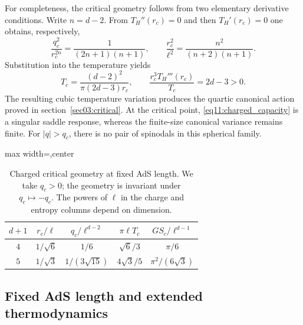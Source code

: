 \documentclass[11pt,letterpaper]{article}
\theoremstyle{plain}
\theoremstyle{definition}
\theoremstyle{remark}
\begin{document}
For completeness, the critical geometry follows from two elementary
derivative conditions.  Write $n=d-2$.  From $T_H''(r_c)=0$ and then
$T_H'(r_c)=0$ one obtains, respectively,
\begin{equation}
 \frac{q_c^2}{r_c^{2n}}=\frac{1}{(2n+1)(n+1)},\qquad
 \frac{r_c^2}{\ell^2}=\frac{n^2}{(n+2)(n+1)}.
 \label{eq11:critical_derivation}
\end{equation}
Substitution into the temperature yields
\begin{equation}
 T_c=\frac{(d-2)^2}{\pi(2d-3)r_c},\qquad
 \frac{r_c^3T_H'''(r_c)}{T_c}=2d-3>0.
 \label{eq11:critical_third_derivative}
\end{equation}
The resulting cubic temperature variation produces the quartic
canonical action proved in section~\ref{sec03:critical}.  At the
critical point, \eqref{eq11:charged_capacity} is a singular saddle
response, whereas the finite-size canonical variance remains finite.
For $|q|>q_c$, there is no pair of spinodals in this spherical family.

\begin{table}[tbp]
 \centering
 \caption{Charged critical geometry at fixed AdS length.  We take
 $q_c>0$; the geometry is invariant under $q_c\mapsto-q_c$.
 The powers of $\ell$ in the charge and entropy columns depend on
 dimension.}
 \label{tab11:charged_critical}
 \begin{adjustbox}{max width=\textwidth,center}
 \begin{tabular}{@{}ccccc@{}}
 \toprule
 $d+1$ & $r_c/\ell$ & $q_c/\ell^{d-2}$ & $\pi\ell T_c$
 & $GS_c/\ell^{d-1}$\\
 \midrule
 $4$ & $1/\sqrt6$ & $1/6$ & $\sqrt6/3$ & $\pi/6$\\[3pt]
 $5$ & $1/\sqrt3$ & $1/(3\sqrt{15})$ & $4\sqrt3/5$
 & $\pi^2/(6\sqrt3)$\\
 \bottomrule
 \end{tabular}
 \end{adjustbox}
\end{table}

\subsection{Fixed AdS length and extended thermodynamics}
\label{app11:extended}
\end{document}
